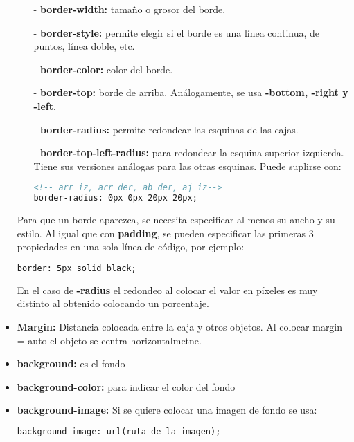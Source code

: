 \documentclass[10pt,oneside]{article}
\begin{document}
\begin{multicols}{2}
\begin{itemize}
        \begin{itemize}
            \item [-]\textbf{border-width:} tamaño o grosor del borde.
            \item [-]\textbf{border-style:} permite elegir si el borde es una línea continua, de puntos, línea doble, etc.
            \item [-]\textbf{border-color:} color del borde.
            \item [-]\textbf{border-top:} borde de arriba. Análogamente, se usa \textbf{-bottom, -right y -left}.
            \item [-]\textbf{border-radius:} permite redondear las esquinas de las cajas.
            \item [-]\textbf{border-top-left-radius:}  para redondear la esquina superior izquierda. Tiene sus versiones análogas para las otras esquinas. Puede suplirse con:
            \begin{lstlisting}[language=HTML]
<!-- arr_iz, arr_der, ab_der, aj_iz-->
border-radius: 0px 0px 20px 20px;
            \end{lstlisting}
        \end{itemize}

        Para que un borde aparezca, se necesita especificar al menos su ancho y su estilo. Al igual que con \textbf{padding}, se pueden especificar las primeras 3 propiedades en una sola línea de código, por ejemplo:

        \begin{lstlisting}[language=HTML]
border: 5px solid black;
        \end{lstlisting}

        En el caso de \textbf{-radius} el redondeo al colocar el valor en píxeles es muy distinto al obtenido colocando un porcentaje.
        
        \item \textbf{Margin:} Distancia colocada entre la caja y otros objetos. Al colocar margin = auto el objeto se centra horizontalmetne.
        \item \textbf{background:} es el fondo
        \item \textbf{background-color:} para indicar el color del fondo 
        \item \textbf{background-image:} Si se quiere colocar una imagen de fondo se usa: 

        \begin{lstlisting}[language=HTML]
background-image: url(ruta_de_la_imagen); 


\end{lstlisting}
\end{itemize}
\end{multicols}
\end{document}
